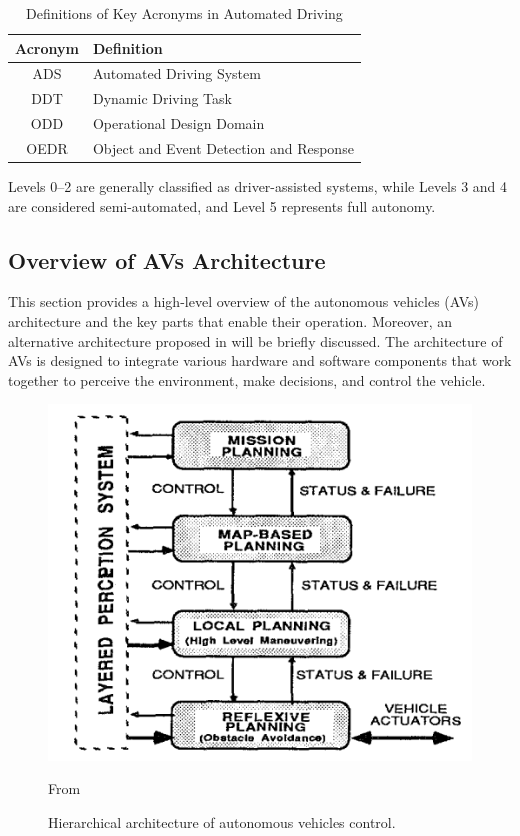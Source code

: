 \begin{table}[ht]
    \centering
    \begin{tabular}{|c|l|}
        \hline
        \textbf{Acronym} & \textbf{Definition} \\ \hline
        ADS & Automated Driving System \\ \hline
        DDT & Dynamic Driving Task \\ \hline
        ODD & Operational Design Domain \\ \hline
        OEDR & Object and Event Detection and Response \\ \hline
    \end{tabular}
    \caption{Definitions of Key Acronyms in Automated Driving}
    \label{tab:acronyms}
\end{table}

Levels 0–2 are generally classified as driver-assisted systems, while Levels 3 and 4 are considered semi-automated, and Level 5 represents full autonomy.

\subsection{Overview of AVs Architecture}\label{subsec:overview-on-avs-architecture}

This section provides a high-level overview of the autonomous vehicles (AVs) architecture and the key parts that enable their operation.
Moreover, an alternative architecture proposed in\cite{2023survey} will be briefly discussed.
The architecture of AVs is designed to integrate various hardware and software components that work together to perceive the environment, make decisions, and control the vehicle.

\cite{architecture}

\begin{figure}[!htb]
    \centering
    \includegraphics[width=0.7\linewidth]{figures/state-architecture}
    \caption{Hierarchical architecture of autonomous vehicles control.}
    \footnotesize{From \cite{architecture} }
    \label{fig:architecture}
\end{figure}

